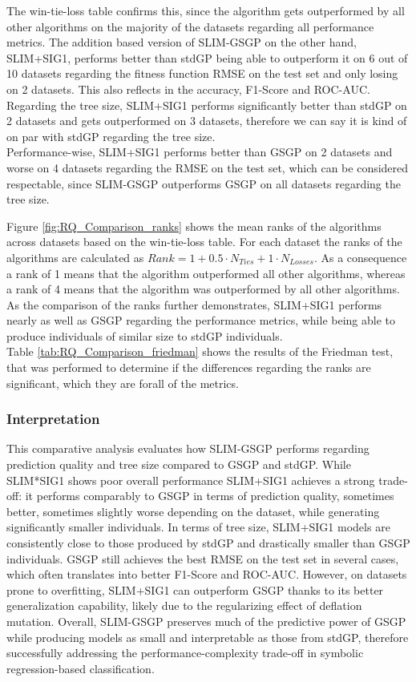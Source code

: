 \documentclass[manuscript, review, anonymous]{acmart} %
\begin{document}

The win-tie-loss table confirms this, since the algorithm gets outperformed by all other algorithms on the majority of the datasets regarding all
performance metrics. The addition based version of SLIM-GSGP on the other hand, SLIM+SIG1, 
performs better than stdGP being able to outperform it on 6 out of 10 datasets regarding the fitness function RMSE on the test set and
only losing on 2 datasets. This also reflects in the accuracy, F1-Score and ROC-AUC. Regarding the tree size, SLIM+SIG1
performs significantly better than stdGP on 2 datasets and gets outperformed on 3 datasets, therefore we can say it is
kind of on par with stdGP regarding the tree size.\\
Performance-wise, SLIM+SIG1 performs better than GSGP on 2 datasets and worse on 4 datasets regarding the RMSE on the test set,
which can be considered respectable, since SLIM-GSGP outperforms GSGP on all datasets regarding the tree size.

\noindent Figure \ref{fig:RQ_Comparison_ranks} shows the mean ranks of the algorithms across
datasets based on the win-tie-loss table.
For each dataset the ranks of the algorithms are calculated
as $Rank = 1 + 0.5 \cdot N_{Ties} + 1
\cdot N_{Losses}$.
As a consequence a rank of 1 means that the
algorithm outperformed all other algorithms,
whereas a rank of 4 means that the algorithm was
outperformed by all other algorithms. 
As the comparison of the ranks further demonstrates, SLIM+SIG1 performs nearly as well as GSGP regarding the performance metrics,
while being able to produce individuals of similar size to stdGP individuals.\\
Table \ref{tab:RQ_Comparison_friedman} shows the results of the Friedman test, that
was performed to determine if the
differences regarding the ranks are significant, which they are forall of the metrics.


\subsubsection{Interpretation}
This comparative analysis evaluates how SLIM-GSGP performs regarding prediction quality and tree size compared to GSGP and stdGP.
While SLIM*SIG1 shows poor overall performance SLIM+SIG1 achieves a strong trade-off:
it performs comparably to GSGP in terms of prediction quality, sometimes better,
sometimes slightly worse depending on the dataset, while generating significantly smaller individuals.
In terms of tree size, SLIM+SIG1 models are consistently close to those produced by stdGP and drastically smaller than GSGP individuals.
GSGP still achieves the best RMSE on the test set in several cases, which often translates into better F1-Score and ROC-AUC.
However, on datasets prone to overfitting, SLIM+SIG1 can outperform GSGP thanks to its better generalization capability, 
likely due to the regularizing effect of deflation mutation.
Overall, SLIM-GSGP preserves much of the predictive power of
GSGP while producing models as small and interpretable as those from stdGP, therefore successfully addressing
the performance-complexity trade-off in symbolic regression-based classification.
\end{document}
